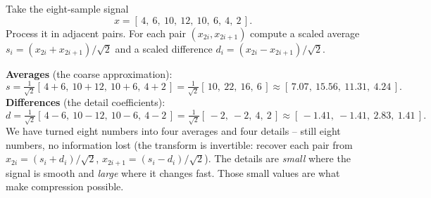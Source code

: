 \begin{example}
\label{ch24:haar-example}
Take the eight-sample signal
\[
x = [\,4,\ 6,\ 10,\ 12,\ 10,\ 6,\ 4,\ 2\,].
\]
Process it in adjacent pairs. For each pair $(x_{2i}, x_{2i+1})$ compute a scaled
average $s_i = (x_{2i}+x_{2i+1})/\sqrt2$ and a scaled difference
$d_i = (x_{2i}-x_{2i+1})/\sqrt2$.

\textbf{Averages} (the coarse approximation):
\[
s = \tfrac{1}{\sqrt2}[\,4{+}6,\ 10{+}12,\ 10{+}6,\ 4{+}2\,]
  = \tfrac{1}{\sqrt2}[\,10,\ 22,\ 16,\ 6\,]
  \approx [\,7.07,\ 15.56,\ 11.31,\ 4.24\,].
\]
\textbf{Differences} (the detail coefficients):
\[
d = \tfrac{1}{\sqrt2}[\,4{-}6,\ 10{-}12,\ 10{-}6,\ 4{-}2\,]
  = \tfrac{1}{\sqrt2}[\,-2,\ -2,\ 4,\ 2\,]
  \approx [\,-1.41,\ -1.41,\ 2.83,\ 1.41\,].
\]
We have turned eight numbers into four averages and four details -- still eight
numbers, no information lost (the transform is invertible: recover each pair from
$x_{2i} = (s_i+d_i)/\sqrt2$, $x_{2i+1} = (s_i-d_i)/\sqrt2$). The details are
\emph{small} where the signal is smooth and \emph{large} where it changes fast.
Those small values are what make compression possible.
\end{example}

